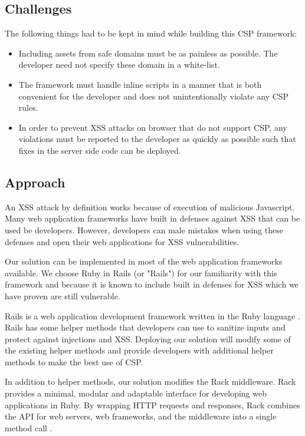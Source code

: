 \documentclass[10pt, conference, compsocconf]{IEEEtran}
\begin{document}
\subsection{Challenges} %
\label{sub:challenges}
The following things had to be kept in mind while building this CSP framework:
\begin{itemize}

	\item Including assets from safe domains must be as painless as possible. The developer need not specify these domain in a white-list.

	\item The framework must handle inline scripts in a manner that is both convenient for the developer and does not unintentionally violate any CSP rules.

	\item In order to prevent XSS attacks on browser that do not support CSP, any violations must be reported to the developer as quickly as possible such that fixes in the server side code can be deployed.
\end{itemize}

\subsection{Approach} %
\label{sub:approach}
An XSS attack by definition works because of execution of malicious Javascript. Many web application frameworks have built in defenses against XSS that can be used be developers. However, developers can male mistakes when using these defenses and open their web applications for XSS vulnerabilities.

Our solution can be implemented in most of the web application frameworks available. We choose Ruby in Rails (or "Rails") for our familiarity with this framework and because it is known to include built in defenses for XSS which we have proven are still vulnerable.

Rails is a web application development framework written in the Ruby language \cite{IEEEhowto:owasp}. Rails has some helper methods that developers can use to sanitize inputs and protect against injections and XSS. Deploying our solution will modify some of the existing helper methods and provide developers with additional helper methods to make the best use of CSP.

In addition to helper methods, our solution modifies the Rack middleware. Rack provides a minimal, modular and adaptable interface for developing web applications in Ruby. By wrapping HTTP requests and responses, Rack combines the API for web servers, web frameworks, and the middleware into a single method call \cite{IEEEhowto:rorrack}. 
\end{document}
